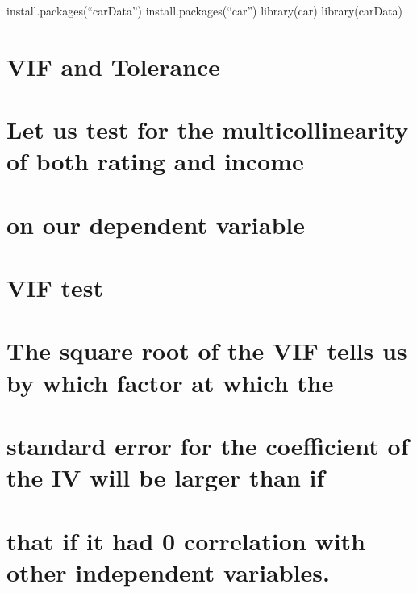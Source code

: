 \documentclass[
]{article}
\begin{document}
install.packages(``carData'') install.packages(``car'') library(car)
library(carData)

\hypertarget{vif-and-tolerance}{%
\section{VIF and Tolerance}\label{vif-and-tolerance}}

\hypertarget{let-us-test-for-the-multicollinearity-of-both-rating-and-income}{%
\section{Let us test for the multicollinearity of both rating and
income}\label{let-us-test-for-the-multicollinearity-of-both-rating-and-income}}

\hypertarget{on-our-dependent-variable}{%
\section{on our dependent variable}\label{on-our-dependent-variable}}

\hypertarget{vif-test}{%
\section{VIF test}\label{vif-test}}

\hypertarget{the-square-root-of-the-vif-tells-us-by-which-factor-at-which-the}{%
\section{The square root of the VIF tells us by which factor at which
the}\label{the-square-root-of-the-vif-tells-us-by-which-factor-at-which-the}}

\hypertarget{standard-error-for-the-coefficient-of-the-iv-will-be-larger-than-if}{%
\section{standard error for the coefficient of the IV will be larger
than
if}\label{standard-error-for-the-coefficient-of-the-iv-will-be-larger-than-if}}

\hypertarget{that-if-it-had-0-correlation-with-other-independent-variables.}{%
\section{that if it had 0 correlation with other independent
variables.}\label{that-if-it-had-0-correlation-with-other-independent-variables.}}
\end{document}
